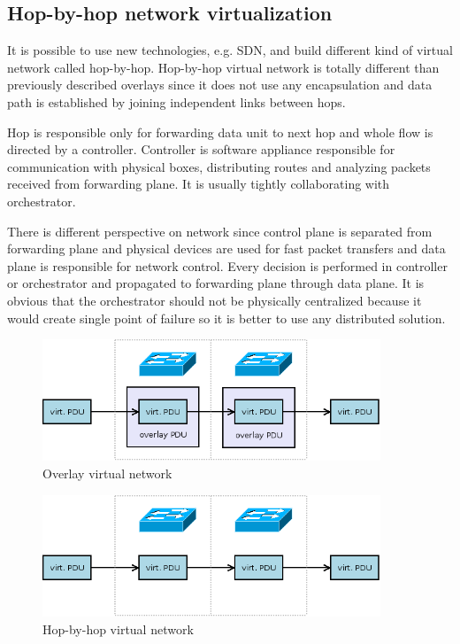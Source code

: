\subsection{Hop-by-hop network virtualization}
It is possible to use new technologies, e.g. \Ac{SDN}, and build different kind of virtual network called hop-by-hop. Hop-by-hop virtual network is totally different than previously described overlays since it does not use any encapsulation and data path is established by joining independent links between hops.

Hop is responsible only for forwarding data unit to next hop and whole flow is directed by a controller. Controller is software appliance responsible for communication with physical boxes, distributing routes and analyzing packets received from forwarding plane. It is usually tightly collaborating with orchestrator.

There is different perspective on network since control plane is separated from forwarding plane and physical devices are used for fast packet transfers and data plane is responsible for network control. Every decision is performed in controller or orchestrator and propagated to forwarding plane through data plane. It is obvious that the orchestrator should not be physically centralized because it would create single point of failure so it is better to use any distributed solution.


\begin{figure}[htb]
	\begin{center}
	\includegraphics[width=0.9\textwidth]{overlay.png}
	\end{center}
	\caption{Overlay virtual network}
	\label{img:overlay}
\end{figure}


\begin{figure}[htb]
	\begin{center}
	\includegraphics[width=0.9\textwidth]{hop-by-hop.png}
	\end{center}
	\caption{Hop-by-hop virtual network}
	\label{img:hop-by-hop}
\end{figure}

